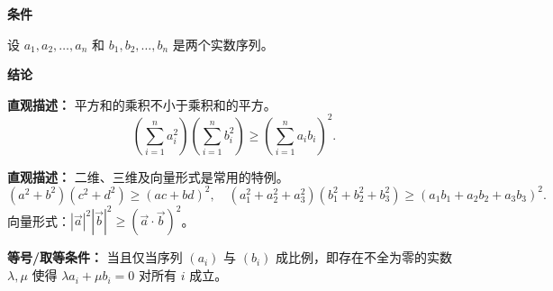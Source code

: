 \begin{statementbox}

\textbf{\textcolor{CStatement}{条件}}
\begin{description}[style=nextline, leftmargin=2.8em, labelsep=0.5em, itemsep=0.35em]
    \item[\textbf{\textcolor{CStatement}{条件 1（实数序列）：}}] 设 $a_1, a_2, \dots, a_n$ 和 $b_1, b_2, \dots, b_n$ 是两个实数序列。
\end{description}

\textbf{\textcolor{CStatement}{结论}}
\begin{description}[style=nextline, leftmargin=2.8em, labelsep=0.5em, itemsep=0.45em]
    \item[\textbf{\textcolor{CStatement}{结论一（一般形式）：}}]
    \textbf{\textcolor{CStatement}{直观描述：}} 平方和的乘积不小于乘积和的平方。
    \[
    \left( \sum_{i=1}^n a_i^2 \right) \left( \sum_{i=1}^n b_i^2 \right) \ge \left( \sum_{i=1}^n a_i b_i \right)^2.
    \]

    \item[\textbf{\textcolor{CStatement}{推广结论（常见特例）：}}]
    \textbf{\textcolor{CStatement}{直观描述：}} 二维、三维及向量形式是常用的特例。
    \[
    (a^2+b^2)(c^2+d^2) \ge (ac+bd)^2, \quad (a_1^2+a_2^2+a_3^2)(b_1^2+b_2^2+b_3^2) \ge (a_1b_1+a_2b_2+a_3b_3)^2.
    \]
    向量形式：$|\vec{a}|^2 |\vec{b}|^2 \ge (\vec{a} \cdot \vec{b})^2$。
\end{description}

\textbf{\textcolor{CStatement}{等号/取等条件：}} 当且仅当序列 $(a_i)$ 与 $(b_i)$ 成比例，即存在不全为零的实数 $\lambda, \mu$ 使得 $\lambda a_i + \mu b_i = 0$ 对所有 $i$ 成立。

\end{statementbox}
